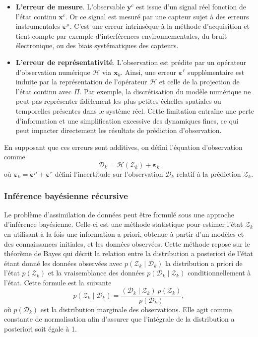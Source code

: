 \begin{itemize}
    \item \textbf{L'erreur de mesure}. L'observable $\bm y^c$ est issue d'un signal réel fonction de l'état continu $\bm x^c$. Or ce signal est mesuré par une capteur sujet à des erreurs instrumentales $\bm \varepsilon^{\mu}$. C'est une erreur intrinsèque à la méthode d'acquisition et tient compte par exemple d'interférences environnementales, du bruit électronique, ou des biais systématiques des capteurs.
    \item \textbf{L'erreur de représentativité}. L'observation est prédite par un opérateur d'observation numérique $\mathcal H$ via $\bm x_k$. Ainsi, une erreur $\bm{\varepsilon}^r$ supplémentaire est induite par la représentation de l'opérateur $\mathcal H$ et celle de la projection de l'état continu avec $\Pi$. Par exemple, la discrétisation du modèle numérique ne peut pas représenter fidèlement les plus petites échelles spatiales ou temporelles présentes dans le système réel. Cette limitation entraîne une perte d'information et une simplification excessive des dynamiques fines, ce qui peut impacter directement les résultats de prédiction d'observation.
\end{itemize}

En supposant que ces erreurs sont additives, on défini l'équation d'observation comme
\begin{equation*}
    \mathcal D_k = \mathcal H (\mathcal{Z}_k) + \bm{\varepsilon}_k
\end{equation*} où $\bm{\varepsilon}_k = \bm{\varepsilon}^\mu  + \bm{\varepsilon}^r$ défini l'incertitude sur l'observation $\mathcal D_k$ relatif à la prédiction $\mathcal{Z}_k$.

\subsubsection{Inférence bayésienne récursive}

Le problème d'assimilation de données peut être formulé sous une approche d'inférence bayésienne. Celle-ci est une méthode statistique pour estimer l'état $\mathcal Z_k$ en utilisant à la fois une information a priori, obtenue à partir d'un modèles et des connaissances initiales, et les données observées. Cette méthode repose sur le théorème de Bayes qui décrit la relation entre la distribution a posteriori de l'état étant donné les données observées avec $p(\mathcal Z_k \mid \mathcal D_k)$ la distribution a priori de l'état $p(\mathcal Z_k)$ et la vraisemblance des données $p(\mathcal D_k \mid \mathcal Z_k)$ conditionnellement à l'état. Cette formule est la suivante
\begin{equation*}
    p(\mathcal Z_k \mid \mathcal D_k) = \frac{(\mathcal D_k \mid \mathcal Z_k)~p(\mathcal Z_k)}{p(\mathcal D_k)},
\end{equation*}où $p(\mathcal D_k)$  est la distribution marginale des observations. Elle agit comme constante de normalisation afin d'assurer que l'intégrale de la distribution a posteriori soit égale à 1.

